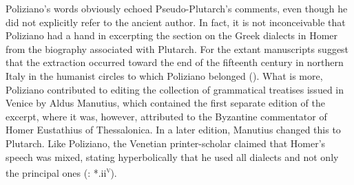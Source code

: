 Poliziano’s words obviously echoed Pseudo-Plutarch’s comments, even though he did not explicitly refer to the ancient author. In fact, it is not inconceivable that Poliziano had a hand in excerpting the section on the Greek dialects in Homer from the biography associated with Plutarch. For the extant manuscripts suggest that the extraction occurred toward the end of the fifteenth century in northern Italy in the humanist circles to which Poliziano belonged (\citealt{VanRooy2018c}). What is more, Poliziano contributed to editing the collection of grammatical treatises issued in Venice by Aldus Manutius, which contained the first separate edition of the excerpt, where it was, however, attributed to the Byzantine commentator of Homer Eustathius of Thessalonica. In a later edition, Manutius changed this to Plutarch. Like Poliziano, the Venetian printer-scholar claimed that Homer’s speech was mixed, stating hyperbolically that he used all dialects and not only the principal ones (\citealt{Manutius1496}: *.ii\textsc{\textsuperscript{v}}).

